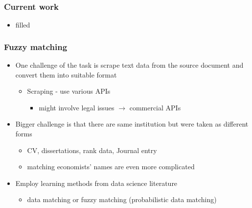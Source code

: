 \documentclass[11pt]{beamer}
\begin{document}
\begin{frame}
	\frametitle{Current work}
	\begin{itemize}
		\item filled
	\end{itemize}
\end{frame}



\begin{frame}[label=appendix]
	\frametitle{Fuzzy matching}
	\begin{itemize}
		\item One challenge of the task is scrape text data from the source document and convert them into suitable format
		\begin{itemize}
			\item Scraping - use various APIs 
			\begin{itemize}
				\item might involve legal issues $\rightarrow$ commercial APIs
			\end{itemize}
		\end{itemize} 
		\item Bigger challenge is that there are same institution but were taken as different forms 
		\begin{itemize}
			\item CV, dissertations, rank data, Journal entry
			\item matching economists' names are even more complicated
		\end{itemize}
			\item Employ learning methods from data science literature
			\begin{itemize}
				\item data matching or fuzzy matching (probabilistic data matching)
			\end{itemize}
	\end{itemize}
\end{frame}
\end{document}
